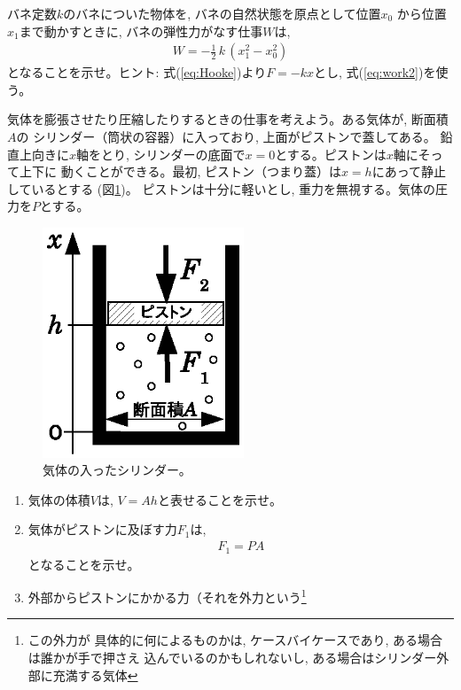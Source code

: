\begin{q}\label{q:spring_work}
バネ定数$k$のバネについた物体を, バネの自然状態を原点として位置$x_0$
から位置$x_1$まで動かすときに, バネの弾性力がなす仕事$W$は, 
\begin{eqnarray}
W=-\frac{1}{2}\,k\,(x_1^2-x_0^2)\label{eq:spring_work}
\end{eqnarray}
となることを示せ。ヒント: 式(\ref{eq:Hooke})より$F=-kx$とし, 式(\ref{eq:work2})を使う。
\end{q}
\vspace{0.2cm}

%
\begin{q}\label{q:gas_work}
気体を膨張させたり圧縮したりするときの仕事を考えよう。ある気体が, 断面積$A$の
シリンダー（筒状の容器）に入っており, 上面がピストンで蓋してある。
鉛直上向きに$x$軸をとり, シリンダーの底面で$x=0$とする。ピストンは$x$軸にそって上下に
動くことができる。最初, ピストン（つまり蓋）は$x=h$にあって静止しているとする
(図\ref{fig:gas_piston})。
ピストンは十分に軽いとし, 重力を無視する。気体の圧力を$P$とする。
\begin{figure}[h]
    \centering
    \includegraphics[width=6cm]{gas_piston.eps}
    \caption{気体の入ったシリンダー。}\label{fig:gas_piston}
\end{figure}
\begin{enumerate}
\item 気体の体積$V$は, $V=Ah$と表せることを示せ。
\item 気体がピストンに及ぼす力$F_1$は, 
\begin{eqnarray}F_1=PA\label{eq:gas_work1}\end{eqnarray}
となることを示せ。
\item 外部からピストンにかかる力（それを外力という\footnote{この外力が
具体的に何によるものかは, ケースバイケースであり, ある場合は誰かが手で押さえ
込んでいるのかもしれないし, ある場合はシリンダー外部に充満する気体
}
\end{enumerate}
\end{q}
